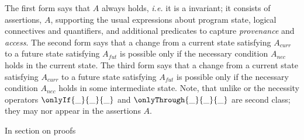 

The first form says that $A$ always holds, \textit{i.e.} it is a invariant; 
it consists of assertions,  $A$, supporting the usual expressions about program state,
  logical connectives and quantifiers, 
 and additional predicates
 to capture \textit{provenance} and \textit{access}.
The second form says that  a change from a current state satisfying $A_{curr}$ to a future
state satisfying $A_{fut}$ %
is possible only if the necessary condition
$A_{nec}$ holds in the current state.
%
The third form says that a change from a current state satisfying $A_{curr}$ to a future
state satisfying $A_{fut}$  is possible only if the necessary condition
$A_{nec}$ holds in some intermediate state.
 Note, that unlike \citeauthor{VerX} or \citeauthor{FASE}
 the necessity operators $\onlyIf {\_} {\_} {\_}$  and $\onlyThrough {\_} {\_} {\_}$
 are second class; they may nor appear in the assertions $A$.
 
 In section on proofs
 

